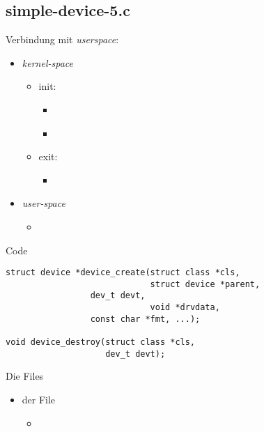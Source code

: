 \subsection{simple-device-5.c}
\begin{frame}{}{Verbindung mit {\em userspace}: }
 \begin{itemize}
  \item {\em kernel-space}
  \begin{itemize}
   \item init: 
   \begin{itemize}
    \item \href{https://elixir.bootlin.com/linux/latest/source/include/linux/device.h\#L1201}
               {}
    \item \href{https://elixir.bootlin.com/linux/latest/source/include/linux/kdev_t.h\#L12}
               {}        
   \end{itemize}
   \item exit: 
   \begin{itemize}
   \item  \href{https://elixir.bootlin.com/linux/latest/source/include/linux/device.h\#L1209}
               {}
   \end{itemize}
  \end{itemize}
  \item {\em user-space}
  \begin{itemize}
   \item {}
  \end{itemize}
 \end{itemize}
\end{frame}

\begin{frame}[fragile]{Code}
\begin{lstlisting}
struct device *device_create(struct class *cls, 
                             struct device *parent,
			     dev_t devt, 
                             void *drvdata,
			     const char *fmt, ...);

void device_destroy(struct class *cls, 
                    dev_t devt);
\end{lstlisting}
\end{frame}

\begin{frame}{Die Files}{}
\begin{itemize}
 \item der File
 \begin{itemize}
  \item {}
 \end{itemize}
\end{itemize}
\end{frame}

